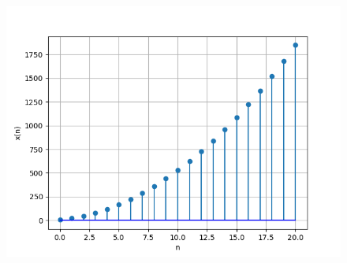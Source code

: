 \documentclass[beamer]{IEEEtran}
\theoremstyle{remark}
\begin{document}
\begin{figure}[ht]
    \centering
    \includegraphics[width=1\columnwidth]{graphs/digital2_graph.png}
    
	\label{fig:11.9.5.22.1}
\end{figure}
\end{document}
